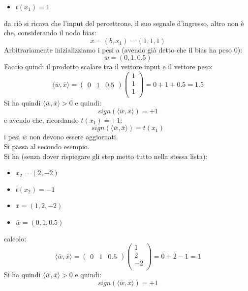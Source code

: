 \begin{esercizio}
\begin{itemize}
							\item $t(x_1)=1$
						\end{itemize}
						da ciò si ricava che l'input del percettrone, il suo segnale d'ingresso, altro
						non è che, considerando il nodo bias:
						\[\overline{x}=(b, x_1)=(1, 1, 1)\]
						Arbitrariamente inizializziamo i pesi a (avendo già detto che il bias ha peso
						0):
						\[\overline{w}=(0, 1, 0.5)\]
						Faccio quindi il prodotto scalare tra il vettore input e il vettore peso:
						\[\langle \overline{w}, \overline{x}\rangle=
							\left(\begin{matrix}
							0 & 1 & 0.5
							\end{matrix}\right)
							\left(
							\begin{matrix}
								1 \\
								1 \\
								1 \\
							\end{matrix}
							\right)= 0 + 1 + 0.5 = 1.5
						\]
						Si ha quindi $\langle \overline{w}, \overline{x}\rangle > 0$ e quindi:
						\[sign(\langle \overline{w}, \overline{x}\rangle)=+1\]
						e avendo che, ricordando $t(x_1)=+1$:
						\[sign(\langle \overline{w}, \overline{x}\rangle)=t(x_1)\]
						i pesi $\overline{w}$ non devono essere aggiornati.\\
						Si passa al secondo esempio.\\
						Si ha (senza dover rispiegare gli step metto tutto nella stessa lista):
						\begin{itemize}
							\item $x_2=(2,-2)$
							\item $t(x_2)=-1$
							\item $\overline{x}=(1, 2,-2)$
							\item $\overline{w}=(0, 1, 0.5)$
						\end{itemize}
						calcolo:
						\[\langle \overline{w}, \overline{x}\rangle=
							\left(\begin{matrix}
							0 & 1 & 0.5
							\end{matrix}\right)
							\left(
							\begin{matrix}
								1  \\
								2  \\
								-2 \\
							\end{matrix}
							\right)= 0 + 2 - 1 = 1
						\]
						Si ha quindi $\langle \overline{w}, \overline{x}\rangle > 0$ e quindi:
						\[sign(\langle \overline{w}, \overline{x}\rangle)=+1\]

\end{esercizio}
